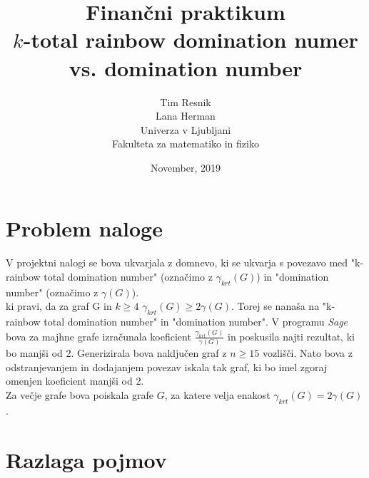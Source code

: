 \documentclass[a4paper]{article}
\title{Finančni praktikum \\\vspace{2cm} {\huge $k$-total rainbow domination numer vs. domination number}\vspace{2cm}}
\author{Tim Resnik \\[1.5mm] Lana Herman \\[1.5mm]\vspace{6cm}
Univerza v Ljubljani \\[1.5mm]
Fakulteta za matematiko in fiziko \vspace{2cm}}
\date{November, 2019}
\begin{document}
\begin{titlepage}
\clearpage \maketitle
\thispagestyle{empty}
\end{titlepage}

\section{Problem naloge}

V projektni nalogi se bova ukvarjala z domnevo, ki se ukvarja s povezavo med "k-rainbow total domination number" (označimo z $\gamma_{krt}(G)$)  in "domination number" (označimo z $\gamma(G)$).\\[3mm]


ki pravi, da za graf G in $k \geq 4$  $\gamma_{krt}(G) \geq 2\gamma(G)$. Torej se nanaša na "k-rainbow total domination number"  in "domination number". V programu \textit{Sage} bova za majhne grafe izračunala koeficient $\frac{\gamma_{krt}(G)}{\gamma(G)}$ in poskusila najti rezultat, ki bo manjši od 2. Generizirala bova naključen graf z $n \geq 15$ vozlišči. Nato bova z odstranjevanjem in dodajanjem povezav iskala tak graf, ki bo imel zgoraj omenjen koeficient manjši od 2.\\
Za večje grafe bova poiskala grafe $G$, za katere velja enakost $\gamma_{krt}(G) = 2\gamma(G)$. 

\section{Razlaga pojmov}
\end{document}

